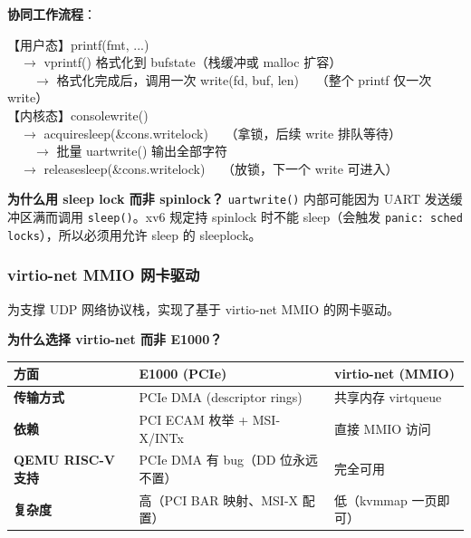 \documentclass[12pt,a4paper]{ctexart}
\begin{document}
\textbf{协同工作流程}：

\begin{flushleft}
\small\ttfamily
【用户态】printf(fmt, ...)                                \\
~~$\rightarrow$ vprintf() 格式化到 bufstate（栈缓冲或 malloc 扩容） \\
~~~~$\rightarrow$ 格式化完成后，调用一次 write(fd, buf, len)  ~~{\normalfont\small（整个 printf 仅一次 write）} \\
\medskip
【内核态】consolewrite()                                  \\
~~$\rightarrow$ acquiresleep(\&cons.writelock) ~~{\normalfont\small（拿锁，后续 write 排队等待）} \\
~~~~$\rightarrow$ 批量 uartwrite() 输出全部字符              \\
~~$\rightarrow$ releasesleep(\&cons.writelock) ~~{\normalfont\small（放锁，下一个 write 可进入）}
\end{flushleft}

\textbf{为什么用 sleep lock 而非 spinlock？}
\texttt{uartwrite()} 内部可能因为 UART 发送缓冲区满而调用 \texttt{sleep()}。xv6 规定持 spinlock 时不能 sleep（会触发 \texttt{panic: sched locks}），所以必须用允许 sleep 的 sleeplock。

\subsubsection{virtio-net MMIO 网卡驱动}

为支撑 UDP 网络协议栈，实现了基于 virtio-net MMIO 的网卡驱动。

\textbf{为什么选择 virtio-net 而非 E1000？}

\begin{table}[H]
\centering
\begin{tabular}{>{\bfseries}p{2.5cm}p{5cm}p{5cm}}
\toprule
\textbf{方面} & \textbf{E1000 (PCIe)} & \textbf{virtio-net (MMIO)} \\
\midrule
传输方式 & PCIe DMA (descriptor rings) & 共享内存 virtqueue \\
依赖 & PCI ECAM 枚举 + MSI-X/INTx & 直接 MMIO 访问 \\
QEMU RISC-V 支持 & PCIe DMA 有 bug（DD 位永远不置） & 完全可用 \\
复杂度 & 高（PCI BAR 映射、MSI-X 配置） & 低（kvmmap 一页即可） \\
\bottomrule
\end{tabular}
\end{table}
\end{document}
